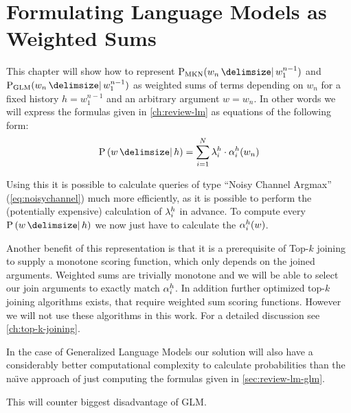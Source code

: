 \chapter{Formulating Language Models as Weighted Sums}
\label{ch:weightedsum}



This chapter will show how to represent  $\ProbMKN{w_n}{w_1^{n-1}}$ and
$\ProbGLM{w_n}{w_1^{n-1}}$ as weighted sums of terms depending on $w_n$ for a
fixed history $h = w_1^{n-1}$ and an  arbitrary argument $w = w_n$.
In other words we will express the formulas given in \cref{ch:review-lm} as
equations of the following form:
\begin{equation}
  \Prob{w}{h} = \sum_{i = 1}^{N} \SumWeight_i^h \cdot \SumArg_i^h(w_n)
\end{equation}

Using this it is possible to calculate queries of type ``Noisy Channel Argmax''
(\cref{eq:noisychannel}) much more efficiently, as it is possible to perform the
(potentially expensive) calculation of $\lambda_i^h$ in advance.
To compute every $\Prob{w}{h}$ we now just have to calculate the
$\alpha_i^h(w)$.

Another benefit of this representation is that it is a prerequisite of Top-$k$
joining to supply a monotone scoring function, which only depends on the
joined arguments.
Weighted sums are trivially monotone  and we will be able to
select our join arguments to exactly match $\alpha_i^h$.
In addition further optimized top-$k$ joining algorithms exists, that require
weighted sum scoring functions.
However we will not use these algorithms in this work.
For a detailed discussion see \cref{ch:top-k-joining}.

In the case of Generalized Language Models our solution will also have a
considerably better computational complexity to calculate probabilities than the
na{\"\i}ve  approach of just computing
the formulas given in
\cref{sec:review-lm-glm}.
\begin{draft}
This will counter biggest disadvantage of GLM.
\end{draft}

